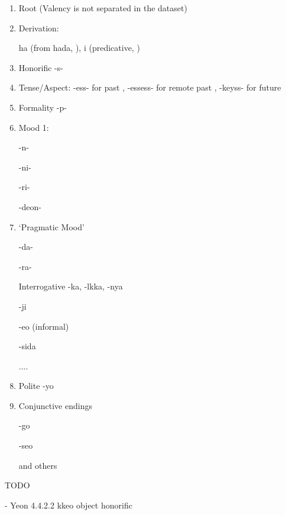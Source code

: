 \documentclass[11pt,letterpaper]{article}
\begin{document}
\begin{enumerate}
    \item Root (Valency is not separated in the dataset)
    \item Derivation:
    
    ha (from hada, \citep[4.1.2]{yeon2010korean}), i (predicative, \citep[4.1.4]{yeon2010korean})
    
    \item Honorific -s- \citep[4.3.2, 4.4.1]{yeon2010korean}
    \item Tense/Aspect: -ess- for past \citep[4.5.1.1]{yeon2010korean}, -essess- for remote past \citep[4.5.1.2]{yeon2010korean}, -keyss- for future \citep[4.5.2.1]{yeon2010korean}
    \item Formality -p- \citep[4.3.2]{yeon2010korean}
    \item Mood 1:
    
    -n-
    
    -ni- \citep[4.3.2]{yeon2010korean}
    
    -ri-
    
    -deon-
    
    \item `Pragmatic Mood'
    
    -da- \citep[4.3.2]{yeon2010korean}
    
    -ra- 
    
    Interrogative -ka, -lkka, -nya
    
    -ji \citep[4.2.2-3]{yeon2010korean}
    
    -eo (informal)
    
    -sida \citep[4.3.2]{yeon2010korean}
    
    ....
    
    \item Polite -yo
    \item Conjunctive endings
    
    -go
    
    -seo
    
    and others
    
\end{enumerate}

TODO 

- Yeon 4.4.2.2 kkeo object honorific %

\end{document}
